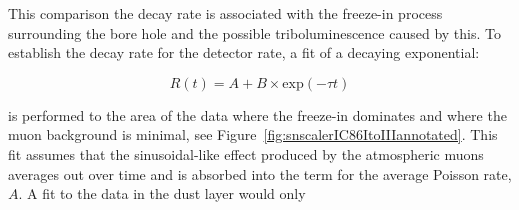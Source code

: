 This comparison the decay rate is associated with the freeze-in process surrounding the bore hole and the possible triboluminescence caused by this. To establish the decay rate for the detector rate, a fit of a decaying exponential:

\begin{equation}
  R(t) = A + B \times \textrm{exp}\left( -\tau t \right)   
\end{equation} 

\noindent is performed to the area of the data where the freeze-in dominates and where the muon background is minimal, see Figure~\ref{fig:snscalerIC86ItoIIIannotated}. This fit assumes that the sinusoidal-like effect produced by the atmospheric muons averages out over time and is absorbed into the term for the average Poisson rate, $A$. A fit to the data in the dust layer would only 